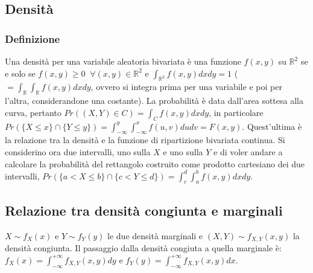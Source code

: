 \subsection{Densit\`a}
\subsubsection{Definizione}
Una densit\`a per una variabile aleatoria bivariata \`e una funzione $f(x, y)$ su $\mathbb{R}^2$ se e solo se $f(x, y)\ge0\;\;\forall (x, y)\in\mathbb{R}^2$ e $\int_{\mathbb{R}
^2}f(x, y)dxdy=1$ ($=\int_\mathbb{R}\int_\mathbb{R}f(x, y)dxdy$, ovvero si integra prima per una variabile e poi per l'altra, considerandone una costante). La probabilit\`a
\`e data dall'area sottesa alla curva, pertanto $Pr((X, Y)\in C)=\int_Cf(x, y)dxdy$, in particolare $Pr(\{X\le x\}\cap \{Y\le y\})=\int_{-\infty}^y\int_{-\infty}^xf(u, 
v)dudv=F(x, y)$. Quest'ultima \`e la relazione tra la densit\`a e la funzione di ripartizione bivariata continua. Si considerino ora due intervalli, uno sulla $X$ e uno sulla 
$Y$ e di voler andare a calcolare la probabilit\`a del rettangolo costruito come prodotto cartesiano dei due intervalli, $Pr(\{a< X\le b\}\cap \{c<Y\le d\})=\int_c^d
\int_a^bf(x, y)dxdy$. 
\subsection{Relazione tra densit\`a congiunta e marginali}
$X\sim f_X(x)$ e $Y\sim f_Y(y)$ le due densit\`a marginali e $(X, Y)\sim f_{X,Y}(x, y)$ la densit\`a congiunta. Il passaggio dalla densit\`a congiuta a quella marginale \`e: 
$f_X(x)=\int_{-\infty}^{+\infty}f_{X,Y}(x, y)dy$ e $f_Y(y)=\int_{-\infty}^{+\infty}f_{X,Y}(x, y)dx$.